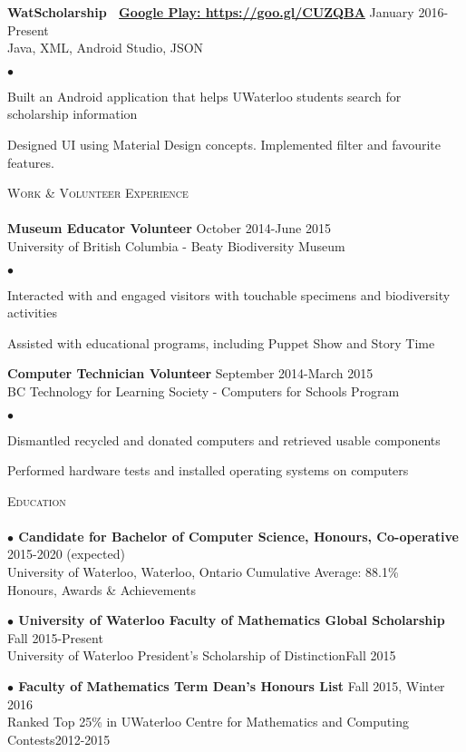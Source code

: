 \documentclass{article}
\newcommand{\lineunder}{\vspace*{-8pt} \\ \hspace*{-18pt} \hrulefill \\}
\newcommand{\header}[1]{{\hspace*{-15pt}\vspace*{6pt} \textsc{#1}} \vspace*{-6pt} \lineunder}
\newcommand{\employer}[3]{{ \textbf{#1} \hfill #2\\ {#3}\\  }}
\newenvironment{achievements}{\begin{list}{$\bullet$}{\topsep 0pt \itemsep -2pt}}{\vspace*{4pt}\end{list}}
\newcommand{\schoolwithcourses}[4]{
 \textbf{$\bullet$ \hspace{2bp}#1} \hfill{#2}\\ \hspace{6mm}#3\\ 
\vspace*{5pt}
}
\newcommand{\award}[3]{\textbf{$\bullet$ \hspace{2bp}#1} \hfill{#2} \\ \vspace{2pt}
}
\begin{document}
\employer{WatScholarship \hspace{5pt} \Mundus~\href{https://goo.gl/CUZQBA}{Google Play: \underline{https://goo.gl/CUZQBA}}}{January 2016-Present}{Java, XML, Android Studio, JSON}
	\begin{achievements}
	\item Built an Android application that helps UWaterloo students search for scholarship information
	\item Designed UI using Material Design concepts. Implemented filter and favourite features.
	\end{achievements}

\header{Work \& Volunteer Experience}
\employer{Museum Educator Volunteer}{October 2014-June 2015}{University of British Columbia - Beaty Biodiversity Museum}
	\begin{achievements}
	\item Interacted with and engaged visitors with touchable specimens and biodiversity activities
	\item Assisted with educational programs, including Puppet Show and Story Time 
	\end{achievements}

\employer{Computer Technician Volunteer}{September 2014-March 2015}{BC Technology for Learning Society - Computers for Schools Program}
	\begin{achievements}
	\item Dismantled recycled and donated computers and retrieved usable components
	\item Performed hardware tests and installed operating systems on computers
	\end{achievements}

\header{Education}

\schoolwithcourses{Candidate for Bachelor of Computer Science, Honours, Co-operative}{2015-2020 (expected)}{University of Waterloo, Waterloo, Ontario \hspace{27pt} Cumulative Average: 88.1\%}


\header{Honours, Awards \& Achievements}

\award {University of Waterloo Faculty of Mathematics Global Scholarship}{Fall 2015-Present}

\award{University of Waterloo President's Scholarship of Distinction}{Fall 2015}

\award{Faculty of Mathematics Term Dean's Honours List}{Fall 2015, Winter 2016}

\award{Ranked Top 25\% in UWaterloo Centre for Mathematics and Computing Contests}{2012-2015}
\end{document}
